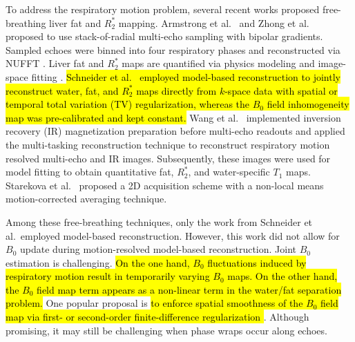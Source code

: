 \documentclass[journal,twoside,web]{ieeecolor}
\begin{document}
To address the respiratory motion problem, 
several recent works proposed free-breathing liver fat and $R_2^*$ mapping. 
Armstrong et al.~\cite{armstrong_2018_fat} and 
Zhong et al.~\cite{zhong_2020_r2sclinic,zhong_2020_resr2s} 
proposed to use stack-of-radial multi-echo sampling with bipolar gradients. 
Sampled echoes were binned into four respiratory phases 
and reconstructed via NUFFT \cite{fessler_2003_nufft}. 
Liver fat and $R_2^*$ maps are quantified 
via physics modeling \cite{yu_2007_t2sideal,yu_2008_mft2sideal,chebrolu_2010_indiwf} 
and image-space fitting \cite{reeder_2005_ideal,hernando_2010_gc,zhong_2014_wfadafit}. 
\hl{Schneider et al.~\mbox{\cite{schneider_2020_mobawfr2s}} 
employed model-based reconstruction 
\mbox{\cite{block_2009_mobat2,fessler_2010_moba,doneva_2010_mobawf}} 
to jointly reconstruct water, fat, and $R_2^*$ maps directly from $k$-space data 
with spatial or temporal total variation (TV) regularization, 
whereas the $B_0$ field inhomogeneity map was pre-calibrated \mbox{\cite{hernando_2010_gc}} 
and kept constant. } 
Wang et al.~\cite{wang_2022_mt-me} implemented 
inversion recovery (IR) magnetization preparation before multi-echo readouts 
and applied the multi-tasking reconstruction technique \cite{christodoulou_2018_mt} 
to reconstruct respiratory motion resolved multi-echo and IR images. 
Subsequently, these images were used for model fitting \cite{hernando_2010_gc} 
to obtain quantitative fat, $R_2^*$, and water-specific $T_1$ maps. 
Starekova et al.~\cite{starekova_2022_fb-fat} proposed a 2D acquisition scheme 
with a non-local means \cite{buades_2005_nlm} motion-corrected averaging technique. 

Among these free-breathing techniques, only the work from Schneider et al.~employed 
model-based reconstruction. However, this work did not allow for $B_0$ update during 
motion-resolved model-based reconstruction. Joint $B_0$ estimation is challenging. 
\hl{On the one hand, $B_0$ fluctuations induced by respiratory motion 
	result in temporarily varying $B_0$ maps. 
	On the other hand, the $B_0$ field map term appears as a non-linear term 
	in the water/fat separation problem.} 
One popular proposal is \hl{to enforce spatial smoothness of the $B_0$ field map 
	via first- or second-order finite-difference regularization 
	\mbox{\cite{sutton_2004_dynamicfield,olafsson_2008_joint,funai_2008_secondorder}}}. 
Although promising, it may still be challenging when phase wraps occur along echoes. 
\end{document}
